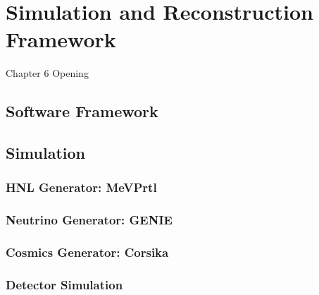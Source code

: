 
\chapter{Simulation and Reconstruction Framework}
\label{Chapter6}

\ifpdf
    \graphicspath{{Chapter6/Figs/Raster/}{Chapter6/Figs/PDF/}{Chapter6/Figs/}}
\else
    \graphicspath{{Chapter6/Figs/Vector/}{Chapter6/Figs/}}
\fi


Chapter 6 Opening

\newpage

\section{Software Framework}

\section{Simulation}

\subsection{HNL Generator: MeVPrtl}

\subsection{Neutrino Generator: GENIE}

\subsection{Cosmics Generator: Corsika}

\subsection{Detector Simulation}


